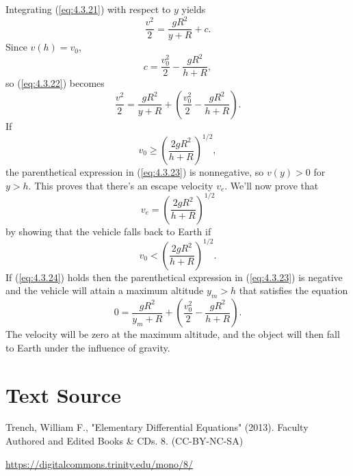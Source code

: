 \documentclass{ximera}
\begin{document}
Integrating (\ref{eq:4.3.21}) with respect to $y$ yields
\begin{equation} \label{eq:4.3.22}
\frac{v^2}{2}=\frac{gR^2}{y+R}+c.
\end{equation}
 Since $v(h)=v_0$,
$$
c=\frac{v_0^2}{2}-\frac{gR^2}{h+R},
$$
 so (\ref{eq:4.3.22}) becomes
\begin{equation} \label{eq:4.3.23}
\frac{v^2}{2}=\frac{gR^2}{y+R}+\left(\frac{v_0^2}{2}-
\frac{gR^2}{h+R}\right).
\end{equation}
If
$$
v_0 \geq\left(\frac{2gR^2}{h+R}\right)^{1/2},
$$
 the parenthetical expression in (\ref{eq:4.3.23})  is nonnegative,
 so $v(y)>0$ for $y>h$. This proves that there's an escape
velocity $v_e$. We'll now prove that
$$
v_e=\left(\frac{2gR^2}{h+R}\right)^{1/2}
$$
by showing that the vehicle falls back to Earth if
\begin{equation} \label{eq:4.3.24}
v_0 <\left(\frac{2gR^2}{h+R}\right)^{1/2}.
\end{equation}
If (\ref{eq:4.3.24})  holds then  the parenthetical expression in
(\ref{eq:4.3.23})
is negative and the vehicle will attain a maximum altitude $y_m>h$
that satisfies the equation
$$
0=\frac{gR^2}{y_m+R}+\left(\frac{v_0^2}{2}-
\frac{gR^2}{h+R}\right).
$$
The velocity will be zero at the maximum  altitude, and the object will
then fall to Earth under the influence of gravity.


\section*{Text Source}
Trench, William F., "Elementary Differential Equations" (2013). Faculty Authored and Edited Books \& CDs. 8. (CC-BY-NC-SA)

\href{https://digitalcommons.trinity.edu/mono/8/}{https://digitalcommons.trinity.edu/mono/8/}
\end{document}
